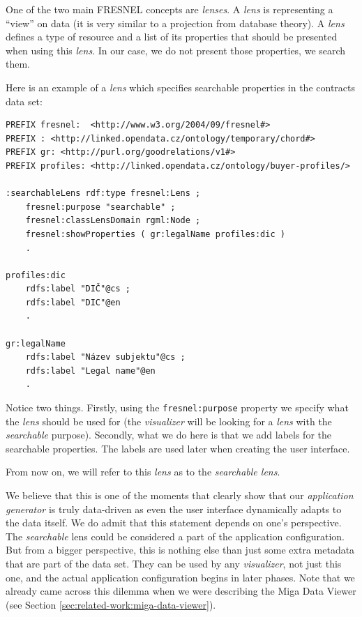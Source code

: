 One of the two main FRESNEL concepts are \emph{lenses}. A \emph{lens} is representing a “view” on data (it is very similar to a projection from database theory). A \emph{lens} defines a type of resource and a list of its properties that should be presented when using this \emph{lens}. In our case, we do not present those properties, we search them.

Here is an example of a \emph{lens} which specifies searchable properties in the contracts data set:

\begin{verbatim}
PREFIX fresnel:  <http://www.w3.org/2004/09/fresnel#>
PREFIX : <http://linked.opendata.cz/ontology/temporary/chord#>
PREFIX gr: <http://purl.org/goodrelations/v1#>
PREFIX profiles: <http://linked.opendata.cz/ontology/buyer-profiles/>

:searchableLens rdf:type fresnel:Lens ;
    fresnel:purpose "searchable" ;
    fresnel:classLensDomain rgml:Node ;
    fresnel:showProperties ( gr:legalName profiles:dic ) 
    .
    
profiles:dic
    rdfs:label "DIČ"@cs ;
    rdfs:label "DIC"@en 
    .
    
gr:legalName
    rdfs:label "Název subjektu"@cs ;
    rdfs:label "Legal name"@en 
    .
\end{verbatim}

Notice two things. Firstly, using the \texttt{fresnel:purpose} property we specify what the \emph{lens} should be used for (the \emph{visualizer} will be looking for a \emph{lens} with the \emph{searchable} purpose). Secondly, what we do here is that we add labels for the searchable properties. The labels are used later when creating the user interface.

From now on, we will refer to this \emph{lens} as to the \emph{searchable lens}.

We believe that this is one of the moments that clearly show that our \emph{application generator} is truly data-driven as even the user interface dynamically adapts to the data itself. We do admit that this statement depends on one’s perspective. The \emph{searchable} lens could be considered a part of the application configuration. But from a bigger perspective, this is nothing else than just some extra metadata that are part of the data set. They can be used by any \emph{visualizer}, not just this one, and the actual application configuration begins in later phases. Note that we already came across this dilemma when we were describing the Miga Data Viewer (see Section \ref{sec:related-work:miga-data-viewer}).

